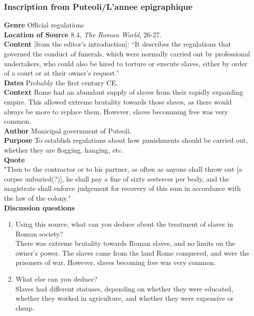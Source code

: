 \documentclass{article}
\begin{document}
\subsubsection*{Inscription from Puteoli/L’annee epigraphique}
\textbf{Genre}
Official regulations \\
\textbf{Location of Source}
8.4, \textit{The Roman World}, 26-27. \\
\textbf{Content}
[from the editor’s introduction]: “It describes the regulations that governed the conduct of
funerals, which were normally carried out by professional undertakers, who could also be
hired to torture or execute slaves, either by order of a court or at their owner’s request.” \\
\textbf{Dates}
Probably the first century CE. \\
\textbf{Context}
Rome had an abundant supply of slaves from their rapidly expanding empire. This allowed
extreme brutality towards those slaves, as there would always be more to replace them.
However, slaves becomming free was very common. \\
\textbf{Author}
Municipal government of Puteoli. \\
\textbf{Purpose}
To establish regulations about how punishments should be carried out, whether they are
flogging, hanging, etc. \\
\textbf{Quote} \\
"Then to the contractor or to his partner, as often as anyone shall throw out [a corpse unburied(?)],
he shall pay a fine of sixty sesterces per body, and the magistrate shall enforce judgement
for recovery of this sum in accordance with the law of the colony."
\\
\textbf{Discussion questions}
\begin{enumerate}
  \item Using this source, what can you deduce about the treatment of slaves in Roman society? \\
  There was extreme brutality towards Roman slaves, and no limits on the owner's power.
  The slaves came from the land Rome conquered, and were the prisoners of war. However,
  slaves becoming free was very common.
  \item What else can you deduce? \\
  Slaves had different statuses, depending on whether they were educated, whether they worked
  in agriculture, and whether they were expensive or cheap.
\end{enumerate}
\end{document}
